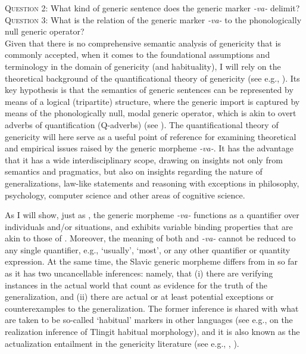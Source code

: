 \documentclass[output=paper,colorlinks,citecolor=brown]{langscibook}
\begin{document}
\noindent 
\textsc{Question 2}: What kind of generic sentence does the generic marker \textit{-va-} delimit? \\

\noindent
\textsc{Question 3}: What is the relation of the  generic marker \textit{-va-}
to the phonologically null generic  operator?\\

\noindent
Given that there is no comprehensive semantic analysis of genericity that is commonly accepted, when it comes to the foundational assumptions and terminology in the domain of genericity (and habituality), 
I will rely 
on the theoretical background
of the quantificational theory of genericity (see e.g., \citealt{krifka1995genericity}). 
Its key hypothesis 
is that the semantics of generic sentences can be represented
by means of a logical (tripartite) structure, where 
the generic import is captured by means of the phonologically null, modal generic  operator, which is akin to overt adverbs of quantification (Q-adverbs) (see  ). 
The quantificational theory of genericity
will here serve as a useful point of reference for examining theoretical and empirical issues raised by the generic morpheme \textit{-va-}. It has the advantage that it has a wide interdisciplinary scope, drawing on insights not only from semantics and pragmatics, but also on insights regarding the nature of 
generalizations, law-like statements and reasoning with exceptions 
in philosophy, psychology, computer science and other areas of cognitive science. 

As I will show, just as ,
the generic morpheme \textit{-va-} functions as a quantifier over individuals and/or situations, and exhibits variable binding properties that are akin to those of . Moreover, the meaning of both 
and \textit{-va-} cannot be reduced to any single quantifier, e.g.,  `usually',  `most', or any other quantifier or quantity expression. At the same time, the Slavic generic morpheme 
differs from  in so far
as it has two uncancellable inferences: namely, that 
(i) there are verifying instances in the actual world that count as evidence for the truth of the generalization, and (ii) there are actual or at least potential exceptions or counterexamples to the generalization. The former inference is shared with what are taken to be so-called `habitual'  markers in other languages (see e.g., \citealt{cable2022} on the realization inference of Tlingit habitual morphology), and it is also known as the actualization entailment in the genericity literature (see e.g., \citealt{green2000aspectual}, \citealt{hacquardDISS}). 
\end{document}
